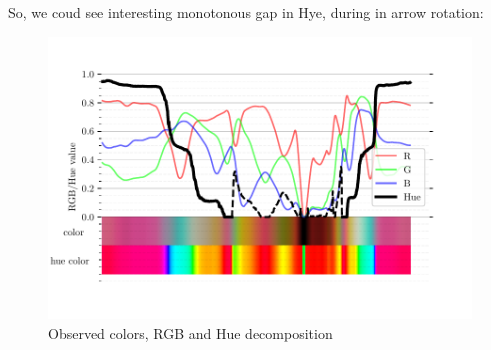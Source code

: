 So, we coud see interesting monotonous gap in Hye, during in arrow rotation:

\begin{figure}[h]
    \centering
    \includegraphics[width=1\textwidth]{figures/P3.pdf}
    \caption{Observed colors, RGB and Hue decomposition}
\end{figure}
